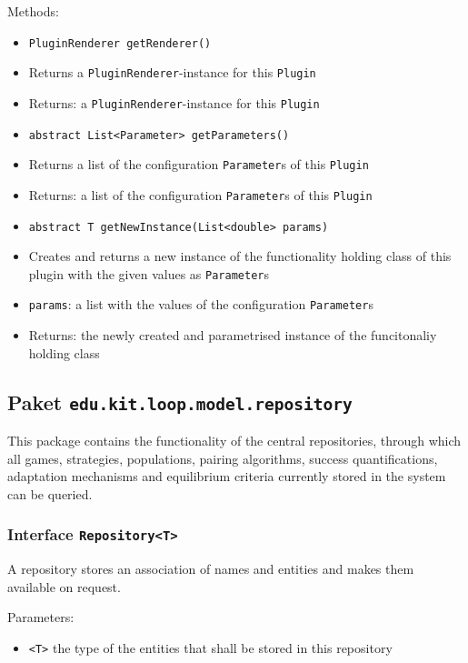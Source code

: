 \documentclass[parskip=full,11pt]{scrartcl}
\begin{document}
Methods:
\begin{itemize}\itemsep -10pt
	\item \texttt{PluginRenderer getRenderer()}
	\item[] Returns a \texttt{PluginRenderer}-instance for this \texttt{Plugin}
	\item[] Returns: a \texttt{PluginRenderer}-instance for this \texttt{Plugin}
	
	\item \texttt{abstract List<Parameter> getParameters()}
	\item[] Returns a list of the configuration \texttt{Parameter}s of this \texttt{Plugin}
	\item[] Returns: a list of the configuration \texttt{Parameter}s of this \texttt{Plugin}
	
	\item \texttt{abstract T getNewInstance(List<double> params)}
	\item[] Creates and returns a new instance of the functionality holding class of this plugin with the given values as \texttt{Parameter}s
	\item[] \texttt{params}: a list with the values of the configuration \texttt{Parameter}s
	\item[] Returns: the newly created and parametrised instance of the funcitonaliy holding class
\end{itemize}

\subsection{Paket \texttt{edu.kit.loop.model.repository}}

This package contains the functionality of the central repositories, through which all games, strategies, populations, pairing algorithms, success quantifications, adaptation mechanisms and equilibrium criteria currently stored in the system can be queried.


\subsubsection{Interface \texttt{Repository<T>}}

A repository stores an association of names and entities and makes them available on request.

Parameters:
\begin{itemize}\itemsep -10pt
	\item \texttt{<T>} the type of the entities that shall be stored in this repository
\end{itemize}
\end{document}
